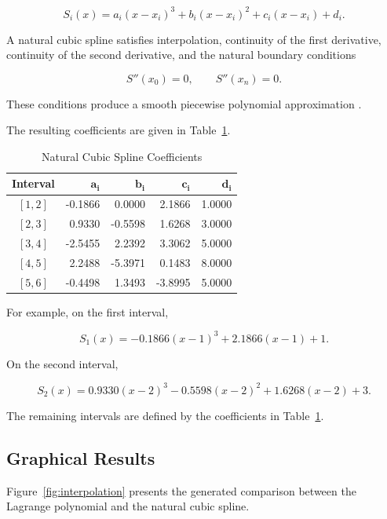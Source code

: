 \documentclass[11pt,a4paper]{article}
\begin{document}
\[
S_i(x)
=
a_i(x-x_i)^3
+
b_i(x-x_i)^2
+
c_i(x-x_i)
+
d_i.
\]

A natural cubic spline satisfies interpolation, continuity of the first
derivative, continuity of the second derivative, and the natural boundary
conditions

\[
S''(x_0)=0,
\qquad
S''(x_n)=0.
\]

These conditions produce a smooth piecewise polynomial approximation
\cite{burden2010,chapra2015}.

The resulting coefficients are given in
Table~\ref{tab:spline_coefficients}.

\begin{table}[H]
\centering
\caption{Natural Cubic Spline Coefficients}
\label{tab:spline_coefficients}

\begin{tabular}{c|rrrr}
\toprule
\textbf{Interval}
& $\mathbf{a_i}$
& $\mathbf{b_i}$
& $\mathbf{c_i}$
& $\mathbf{d_i}$ \\
\midrule
$[1,2]$ & -0.1866 & 0.0000 & 2.1866 & 1.0000 \\
$[2,3]$ &  0.9330 & -0.5598 & 1.6268 & 3.0000 \\
$[3,4]$ & -2.5455 & 2.2392 & 3.3062 & 5.0000 \\
$[4,5]$ &  2.2488 & -5.3971 & 0.1483 & 8.0000 \\
$[5,6]$ & -0.4498 & 1.3493 & -3.8995 & 5.0000 \\
\bottomrule
\end{tabular}
\end{table}

For example, on the first interval,

\[
S_1(x)
=
-0.1866(x-1)^3
+
2.1866(x-1)
+
1.
\]

On the second interval,

\[
S_2(x)
=
0.9330(x-2)^3
-
0.5598(x-2)^2
+
1.6268(x-2)
+
3.
\]

The remaining intervals are defined by the coefficients in
Table~\ref{tab:spline_coefficients}.


\subsection{Graphical Results}

Figure~\ref{fig:interpolation} presents the generated comparison between
the Lagrange polynomial and the natural cubic spline.
\end{document}
